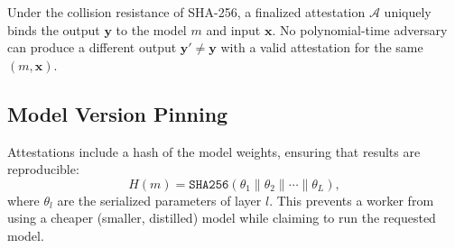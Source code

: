 \begin{theorem}
Under the collision resistance of SHA-256, a finalized attestation
$\mathcal{A}$ uniquely binds the output $\mathbf{y}$ to the model $m$ and input
$\mathbf{x}$. No polynomial-time adversary can produce a different output
$\mathbf{y}' \neq \mathbf{y}$ with a valid attestation for the same $(m,
\mathbf{x})$.
\end{theorem}

\subsection{Model Version Pinning}

Attestations include a hash of the model weights, ensuring that results are
reproducible:
\begin{equation}
H(m) = \texttt{SHA256}(\theta_1 \| \theta_2 \| \cdots \| \theta_L),
\end{equation}
where $\theta_l$ are the serialized parameters of layer $l$. This prevents a
worker from using a cheaper (smaller, distilled) model while claiming to run
the requested model.

